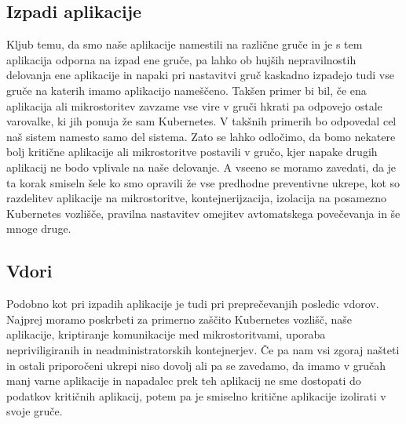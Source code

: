 \documentclass[a4paper, 12pt]{book}
\begin{document}
\subsection{Izpadi aplikacije}
Kljub temu, da smo naše aplikacije namestili na različne gruče in je s tem aplikacija odporna na izpad ene gruče, pa lahko ob hujših nepravilnostih delovanja ene aplikacije in napaki pri nastavitvi gruč kaskadno izpadejo tudi vse gruče na katerih imamo aplikacijo nameščeno.
Takšen primer bi bil, če ena aplikacija ali mikrostoritev zavzame vse vire v gruči hkrati pa odpovejo ostale varovalke, ki jih ponuja že sam Kubernetes.
V takšnih primerih bo odpovedal cel naš sistem namesto samo del sistema.
Zato se lahko odločimo, da bomo nekatere bolj kritične aplikacije ali mikrostoritve postavili v gručo, kjer napake drugih aplikacij ne bodo vplivale na naše delovanje.
A vseeno se moramo zavedati, da je ta korak smiseln šele ko smo opravili že vse predhodne preventivne ukrepe, kot so razdelitev aplikacije na mikrostoritve, kontejnerijzacija, izolacija na posamezno Kubernetes vozlišče, pravilna nastavitev omejitev avtomatskega povečevanja in še mnoge druge.
\subsection{Vdori}
Podobno kot pri izpadih aplikacije je tudi pri preprečevanjih posledic vdorov.
Najprej moramo poskrbeti za primerno zaščito Kubernetes vozlišč, naše aplikacije, kriptiranje komunikacije med mikrostoritvami, uporaba nepriviligiranih in neadministratorskih kontejnerjev.
Če pa nam vsi zgoraj našteti in ostali priporočeni ukrepi niso dovolj ali pa se zavedamo, da imamo v gručah manj varne aplikacije in napadalec prek teh aplikacij ne sme dostopati do podatkov kritičnih aplikacij, potem pa je smiselno kritične aplikacije izolirati v svoje gruče.
\end{document}
